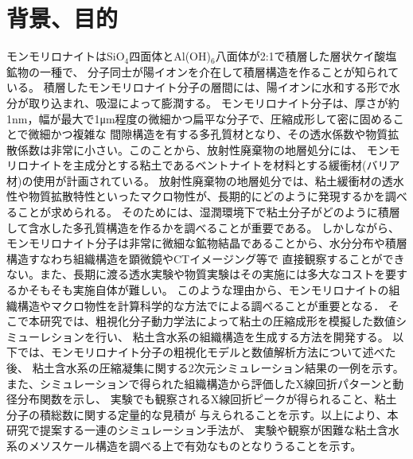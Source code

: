﻿\documentclass[11pt,a4j]{jarticle}
\begin{document}
\section{背景、目的}
モンモリロナイトはSiO$_4$四面体とAl(OH)$_6$八面体が2:1で積層した層状ケイ酸塩鉱物の一種で、
分子同士が陽イオンを介在して積層構造を作ることが知られている。
積層したモンモリロナイト分子の層間には、陽イオンに水和する形で水分が取り込まれ、吸湿によって膨潤する。
モンモリロナイト分子は、厚さが約1nm，幅が最大で1μm程度の微細かつ扁平な分子で、圧縮成形して密に固めることで微細かつ複雑な
間隙構造を有する多孔質材となり、その透水係数や物質拡散係数は非常に小さい。このことから、放射性廃棄物の地層処分には、
モンモリロナイトを主成分とする粘土であるベントナイトを材料とする緩衝材(バリア材)の使用が計画されている。
放射性廃棄物の地層処分では、粘土緩衝材の透水性や物質拡散特性といったマクロ物性が、長期的にどのように発現するかを調べることが求められる。
そのためには、湿潤環境下で粘土分子がどのように積層して含水した多孔質構造を作るかを調べることが重要である。
しかしながら、モンモリロナイト分子は非常に微細な鉱物結晶であることから、水分分布や積層構造すなわち組織構造を顕微鏡やCTイメージング等で
直接観察することができない。また、長期に渡る透水実験や物質実験はその実施には多大なコストを要するかそもそも実施自体が難しい。
このような理由から、モンモリロナイトの組織構造やマクロ物性を計算科学的な方法でによる調べることが重要となる．
そこで本研究では、粗視化分子動力学法によって粘土の圧縮成形を模擬した数値シミューレションを行い、
粘土含水系の組織構造を生成する方法を開発する。
以下では、モンモリロナイト分子の粗視化モデルと数値解析方法について述べた後、
粘土含水系の圧縮凝集に関する2次元シミュレーション結果の一例を示す。
また、シミュレーションで得られた組織構造から評価したX線回折パターンと動径分布関数を示し、
実験でも観察されるX線回折ピークが得られること、粘土分子の積総数に関する定量的な見積が
与えられることを示す。以上により、本研究で提案する一連のシミュレーション手法が、
実験や観察が困難な粘土含水系のメソスケール構造を調べる上で有効なものとなりうることを示す。
\end{document}
